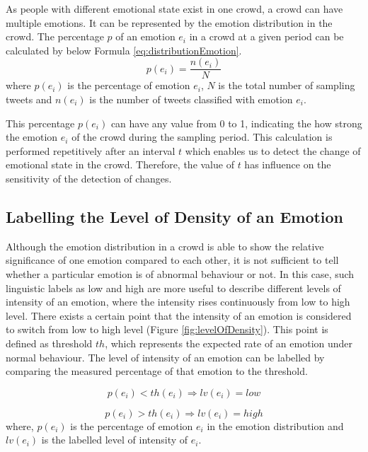 As people with different emotional state exist in one crowd, a crowd can have multiple emotions. It can be represented by the emotion distribution in the crowd. The percentage \(p\) of an emotion \(e_i\) in a crowd at a given period can be calculated by below Formula \ref{eq:distributionEmotion}.
\begin{equation}
\label{eq:distributionEmotion}
	p(e_i) = \frac{n(e_i)}{N}
\end{equation}
where \(p(e_i)\) is the percentage of emotion \(e_i\), \(N\) is the total number of sampling tweets and \(n(e_i)\) is the number of tweets classified with emotion \(e_i\).

This percentage \(p(e_i)\) can have any value from 0 to 1, indicating the how strong the emotion \(e_i\) of the crowd during the sampling period. This calculation is performed repetitively after an interval \(t\) which enables us to detect the change of emotional state in the crowd. Therefore, the value of \(t\) has influence on the sensitivity of the detection of changes.

\subsection{Labelling the Level of Density of an Emotion}
Although the emotion distribution in a crowd is able to show the relative significance of one emotion compared to each other, it is not sufficient to tell whether a particular emotion is of abnormal behaviour or not. In this case, such linguistic labels as low and high are more useful to describe different levels of intensity of an emotion, where the intensity rises continuously from low to high level. There exists a certain point that the intensity of an emotion is considered to switch from low to high level (Figure \ref{fig:levelOfDensity}). This point is defined as threshold \(th\), which represents the expected rate of an emotion under normal behaviour. The level of intensity of an emotion can be labelled by comparing the measured percentage of that emotion to the threshold.

\begin{equation}
\label{eq:lowIntensity}
	p(e_i) < th(e_i) \Rightarrow lv(e_i) = low
\end{equation}

\begin{equation}
\label{eq:highIntensity}
	p(e_i) > th(e_i) \Rightarrow lv(e_i) = high
\end{equation}
where, \(p(e_i)\) is the percentage of emotion \(e_i\) in the emotion distribution and \(lv(e_i)\) is the labelled level of intensity of \(e_i\).

